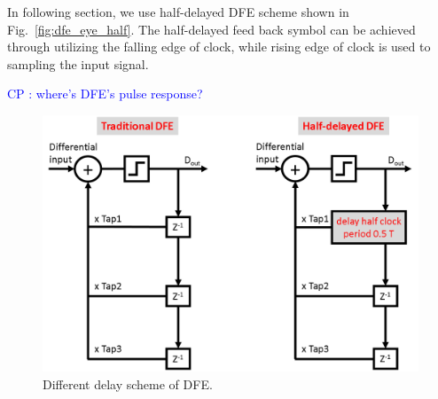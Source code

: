 \documentclass{book}  %
\newcommand{\cphighlight}[1]{\Huge\textcolor{blue}{CP : #1}\normalsize}
\begin{document}
\begin{paper}
In following section, we use half-delayed DFE scheme shown in Fig.~\ref{fig:dfe_eye_half}. The half-delayed feed back symbol can be achieved through utilizing the falling edge of clock, while rising edge of clock is used to sampling the input signal. 

\cphighlight{where's DFE's pulse response?}

\begin{figure}[htbp!]
	\centering
	\includegraphics[width=0.8\columnwidth]{./img/Verilog/dfe/half-delayed_DFE_comparison.png}
	\caption{Different delay scheme of DFE.}
	\label{fig:dfe_delay_scheme} %
\end{figure}


\end{paper}
\end{document}
